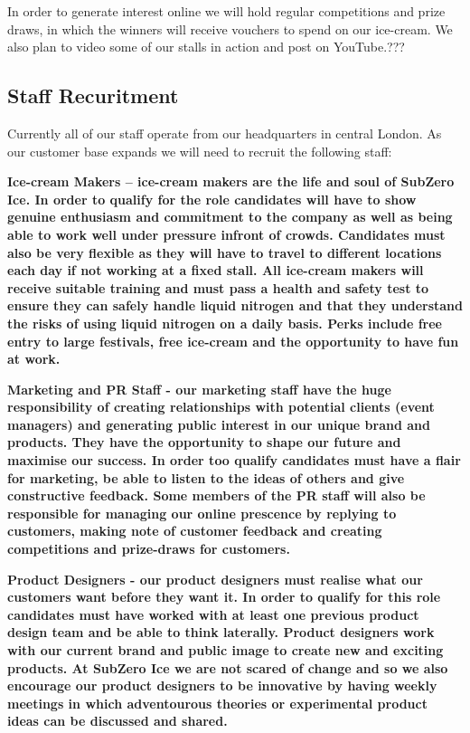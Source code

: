 \documentclass{article}
\begin{document}
  In order to generate interest online we will hold regular competitions and prize draws, in which the winners will receive vouchers to spend on our ice-cream. We also plan to video some of our stalls in action and post on YouTube.???

  \subsection{Staff Recuritment}

  Currently all of our staff operate from our headquarters in central London. As our customer base expands we will need to recruit the following staff:

 \bf{Ice-cream Makers} – ice-cream makers are the life and soul of SubZero Ice. In order to qualify for the role candidates will have to show genuine enthusiasm and commitment to the company as well as being able to work well under pressure infront of crowds. Candidates must also be very flexible as they will have to travel to different locations each day if not working at a fixed stall. All ice-cream makers will receive suitable training and must pass a health and safety test to ensure they can safely handle liquid nitrogen and that they understand the risks of using liquid nitrogen on a daily basis. Perks include free entry to large festivals, free ice-cream and the opportunity to have fun at work.

 \bf{Marketing and PR Staff} - our marketing staff have the huge responsibility of creating relationships with potential clients (event managers) and generating public interest in our unique brand and products. They have the opportunity to shape our future and maximise our success. In order too qualify candidates must have a flair for marketing, be able to listen to the ideas of others and give constructive feedback. Some members of the PR staff will also be responsible for managing our online prescence by replying to customers, making note of customer feedback and creating competitions and prize-draws for customers.

\bf{Product Designers} - our product designers must realise what our customers want before they want it. In order to qualify for this role candidates must have worked with at least one previous product design team and be able to think laterally. Product designers work with our current brand and public image to create new and exciting products. At SubZero Ice we are not scared of change and so we also encourage our product designers to be innovative by having weekly meetings in which adventourous theories or experimental product ideas can be discussed and shared.
\end{document}
